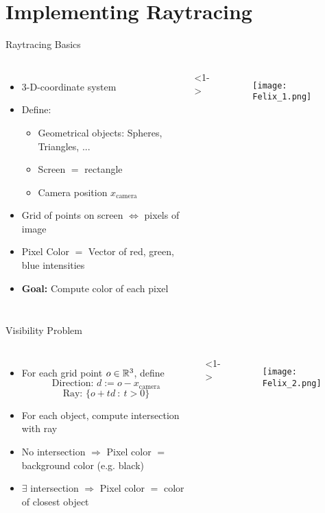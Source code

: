 \section{Implementing Raytracing}
\begin{frame}{Raytracing Basics}
\begin{columns}
    \begin{itemize}
   \item<1-> 3-D-coordinate system
   \item<2-> Define:
   \begin{itemize}
   	\item Geometrical objects: Spheres, Triangles, ...
   	\item Screen $=$ rectangle
    \item Camera position $x_{\text{camera}}$
       
   \end{itemize}
   \item<3-> Grid of points on screen $\Leftrightarrow$ pixels of image
   \item<4-> Pixel Color $=$ Vector of red, green, blue intensities
   \item<5-> \textbf{Goal:} Compute color of each pixel
   \end{itemize}
   <1->
   \begin{figure}
                \centering
                \texttt{[image: Felix\_1.png]}
            \end{figure}
\end{columns}
\end{frame}

\begin{frame}{Visibility Problem}
    \begin{columns}
        \begin{itemize}
            \item<1-> For each grid point $o\in\mathbb{R}^3$, define 
            $$
            \text{Direction: }d := o - x_{\text{camera}}
            $$
            $$
            \text{Ray: } \{o + t d \ : \ t > 0\}
            $$
            \item<2-> For each object, compute intersection with ray
            \item<3-> No intersection $\Rightarrow$ Pixel color $=$ background color (e.g. black)
            \item<4-> $\exists$ intersection $\Rightarrow$ Pixel color $=$ color of closest object
        \end{itemize}
        <1->
        \begin{figure}
                \centering
                \texttt{[image: Felix\_2.png]}
            \end{figure}
    \end{columns}
\end{frame}

